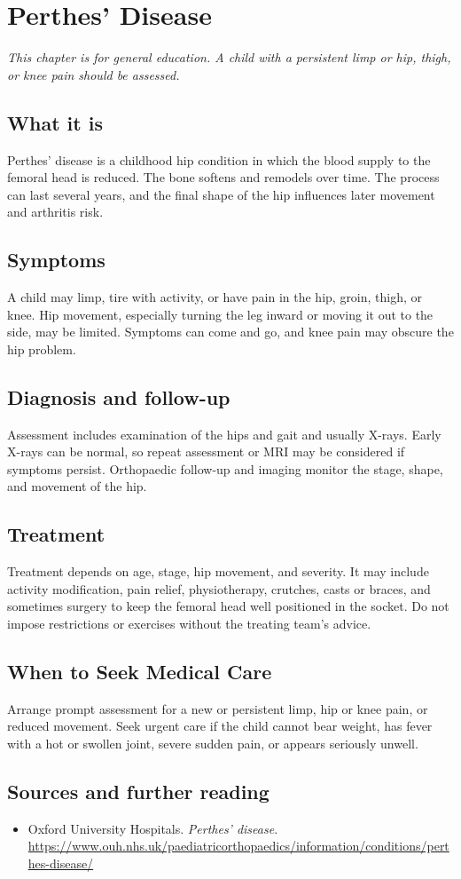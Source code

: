 \chapter{Perthes' Disease}

\medskip
\noindent\textit{This chapter is for general education. A child with a persistent limp or hip, thigh, or knee pain should be assessed.}

\section*{What it is}
Perthes' disease is a childhood hip condition in which the blood supply to the femoral head is reduced. The bone softens and remodels over time. The process can last several years, and the final shape of the hip influences later movement and arthritis risk.

\section*{Symptoms}
A child may limp, tire with activity, or have pain in the hip, groin, thigh, or knee. Hip movement, especially turning the leg inward or moving it out to the side, may be limited. Symptoms can come and go, and knee pain may obscure the hip problem.

\section*{Diagnosis and follow-up}
Assessment includes examination of the hips and gait and usually X-rays. Early X-rays can be normal, so repeat assessment or MRI may be considered if symptoms persist. Orthopaedic follow-up and imaging monitor the stage, shape, and movement of the hip.

\section*{Treatment}
Treatment depends on age, stage, hip movement, and severity. It may include activity modification, pain relief, physiotherapy, crutches, casts or braces, and sometimes surgery to keep the femoral head well positioned in the socket. Do not impose restrictions or exercises without the treating team’s advice.

\section*{When to Seek Medical Care}
Arrange prompt assessment for a new or persistent limp, hip or knee pain, or reduced movement. Seek urgent care if the child cannot bear weight, has fever with a hot or swollen joint, severe sudden pain, or appears seriously unwell.

\section*{Sources and further reading}
\begin{itemize}
\item Oxford University Hospitals. \textit{Perthes' disease}. \url{https://www.ouh.nhs.uk/paediatricorthopaedics/information/conditions/perthes-disease/}
\end{itemize}
